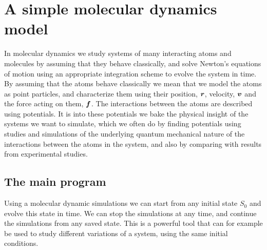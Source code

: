 \chapter{A simple molecular dynamics model\label{chap:simple_md_program}}
In molecular dynamics we study systems of many interacting atoms and molecules by assuming that they behave classically, and solve Newton's equations of motion using an appropriate integration scheme to evolve the system in time. By assuming that the atoms behave classically we mean that we model the atoms as point particles, and characterize them using their position, $\boldsymbol{r}$, velocity, $\boldsymbol{v}$ and the force acting on them, $\boldsymbol{f}$. The interactions between the atoms are described using potentials. It is into these potentials we bake the physical insight of the systems we want to simulate, which we often do by finding potentials using studies and simulations of the underlying quantum mechanical nature of the interactions between the atoms in the system, and also by comparing with results from experimental studies.

\section{The main program}
%
Using a molecular dynamic simulations we can start from any initial state $S_0$ and evolve this state in time. We can stop the simulations at any time, and continue the simulations from any saved state. This is a powerful tool that can for example be used to study different variations of a system, using the same initial conditions.

